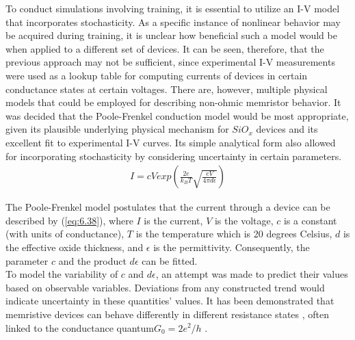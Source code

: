 \noindent To conduct simulations involving training, it is essential to utilize an I-V model that incorporates stochasticity. As a specific instance of nonlinear behavior may be acquired during training, it is unclear how beneficial such a model would be when applied to a different set of devices. It can be seen, therefore, that the previous approach may not be sufficient, since experimental I-V measurements were used as a lookup table for computing currents of devices in certain conductance states at certain voltages. There are, however, multiple physical models that could be employed for describing non-ohmic memristor behavior. It was decided that the Poole-Frenkel conduction model \cite{joksas2022nonideality} would be most appropriate, given its plausible underlying physical mechanism for $SiO_x$  devices and its excellent fit to experimental I-V curves. Its simple analytical form also allowed for incorporating stochasticity by considering uncertainty in certain parameters.
\begin{align}
I = cV exp\left( \frac{2e}{k_BT} \sqrt{\frac{eV}{4\pi d\epsilon}} \right) \label{eq:6.38}
\end{align}

\noindent The Poole-Frenkel model postulates that the current through a device can be described by (\ref{eq:6.38}), where $I$ is the current, $V$ is the voltage, $c$ is a constant (with units of conductance), $T$ is the temperature which is 20 degrees Celsius, $d$ is the effective oxide thickness, and $\epsilon$ is the permittivity. Consequently, the parameter $c$ and the product $d\epsilon$ can be fitted.\\


\noindent To model the variability of $c$ and $d\epsilon$, an attempt was made to predict their values based on observable variables. Deviations from any constructed trend would indicate uncertainty in these quantities' values. It has been demonstrated that memristive devices can behave differently in different resistance states \cite{mehonic2015structural}, often linked to the conductance quantum$G_0 = 2e^2/h$ \cite{yi2016quantized}.\\

